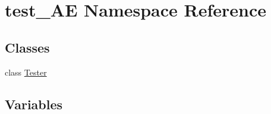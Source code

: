\hypertarget{namespacetest___a_e}{}\section{test\+\_\+\+AE Namespace Reference}
\label{namespacetest___a_e}
\subsection*{Classes}
\begin{DoxyCompactItemize}
\item 
class \hyperlink{classtest___a_e_1_1_tester}{Tester}
\end{DoxyCompactItemize}
\subsection*{Variables}
